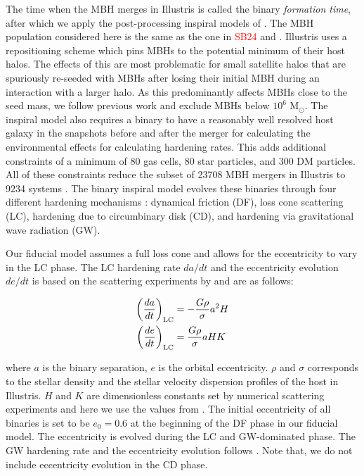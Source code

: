 \documentclass[twocolumn,linenumbers]{aastex701}
\newcommand{\msun}{M$_{\odot}$}
\newcommand{\SB}{\textcolor{red}{SB24}}
\begin{document}
The time when the MBH merges in Illustris is called the binary \emph{formation time}, after which we apply the post-processing inspiral models of  \citet{Kelley_2017a,Kelley_2017b}. The MBH population considered here is the same as the one in \SB{} and \citet{sayeb_massive_2021}. Illustris uses a repositioning scheme which pins MBHs to the potential minimum of their host halos. The effects of this are most problematic for small satellite halos that are spuriously re-seeded with MBHs after losing their initial MBH during an interaction with a larger halo. As this predominantly affects MBHs close to the seed mass, we follow previous work and exclude
MBHs below $10^6$ \msun{}. The inspiral model also requires a binary to have a reasonably well resolved host galaxy in the snapshots before and after the merger for calculating the environmental effects for calculating hardening rates. This adds additional constraints of a minimum of 80 gas cells, 80 star particles, and 300 DM particles. All of these constraints reduce the subset of 23708 MBH mergers in Illustris to 9234 systems \citep{Kelley_2017a,sayeb_massive_2021,sayeb_mbh_2023}. The binary inspiral model \citep{Kelley_2017a, Kelley_2017b,sayeb_massive_2021} evolves these binaries through four different hardening mechanisms \citep{Begelman1980}: dynamical friction (DF), loss cone scattering (LC), hardening due to circumbinary disk (CD), and hardening via gravitational wave radiation (GW). 

Our fiducial model assumes a full loss cone and allows for the eccentricity to vary in the LC phase. The LC hardening rate $da/dt$ and the eccentricity evolution $de/dt$ is based on the scattering experiments by \citet{sesana_interaction_2006} and are as follows:


\begin{align}
    \left( \frac{da}{dt} \right)_{\rm LC} &= - \frac{G \rho}{\sigma} a^2 H\\
    \left( \frac{de}{dt} \right)_{\rm LC} &= \frac{G \rho}{\sigma} a H K
    \label{dadt_lc}
\end{align}

where $a$ is the binary separation, $e$ is the orbital eccentricity. $\rho$ and $\sigma$ corresponds to the stellar density and the stellar velocity dispersion profiles of the host in Illustris. $H$ and $K$ are dimensionless constants set by numerical scattering experiments and here we use the values from \citet{sesana_interaction_2006}. The initial eccentricity of all binaries is set to be $e_{0} = 0.6$ at the beginning of the DF phase in our fiducial model. The eccentricity is evolved during the LC and GW-dominated phase. The GW hardening rate and the eccentricity evolution follows \citet{PetersandMathews1964}. Note that, we do not include eccentricity evolution in the CD phase. 
\end{document}
